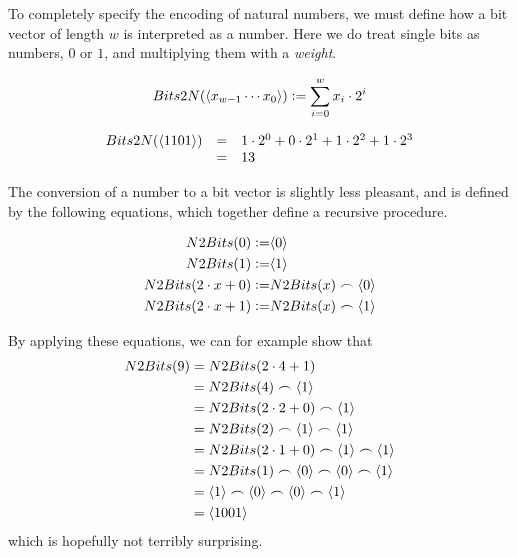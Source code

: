 To completely specify the encoding of natural numbers, we must define
how a bit vector of length $w$ is interpreted as a number.  Here we do
treat single bits as numbers, $0$ or $1$, and multiplying them with a
\emph{weight}.

\begin{equation}
    Bits2N(\langle x_{w-1}\cdots x_{0} \rangle) \vcentcolon= \sum_{i=0}^{w} x_{i} \cdot{} 2^{i}
\end{equation}

\begin{example}
  \[
    \begin{array}{rcl}
      Bits2N(\langle 1101 \rangle) & = & 1 \cdot 2^{0} + 0 \cdot 2^{1} + 1 \cdot 2^{2} + 1 \cdot 2^{3} \\
                               & = & 13
    \end{array}
  \]
\end{example}

The conversion of a number to a bit vector is slightly less pleasant,
and is defined by the following equations, which together define a
recursive procedure.

  \begin{align}
    N2Bits(0) \vcentcolon= & \langle 0 \rangle \\
    N2Bits(1) \vcentcolon= & \langle 1 \rangle \\
    N2Bits(2\cdot{}x + 0) \vcentcolon= & N2Bits(x)\frown\langle 0 \rangle \\
    N2Bits(2\cdot{}x + 1) \vcentcolon= & N2Bits(x)\frown\langle 1 \rangle
  \end{align}

By applying these equations, we can for example show that
\begin{align*}
  N2Bits(9) &= N2Bits(2\cdot{}4 + 1) \\
            &= N2Bits(4) \frown \langle 1 \rangle \\
            &= N2Bits(2\cdot{}2 + 0) \frown \langle 1 \rangle \\
            &= N2Bits(2) \frown \langle 1 \rangle \frown \langle 1 \rangle \\
            &= N2Bits(2\cdot{}1 + 0) \frown \langle 1 \rangle \frown \langle 1 \rangle \\
            &= N2Bits(1) \frown \langle 0 \rangle \frown \langle 0 \rangle \frown \langle 1 \rangle \\
            &= \langle 1 \rangle \frown \langle 0 \rangle \frown \langle 0 \rangle \frown \langle 1 \rangle \\
            &= \langle 1001 \rangle
\end{align*}
which is hopefully not terribly surprising.


